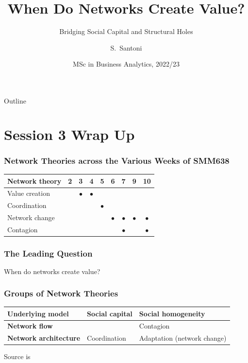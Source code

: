 \documentclass[notes, aspectratio=1610]{beamer}
\title[Networks and Value Creation]
{When Do Networks Create Value?}
\subtitle{Bridging Social Capital and Structural Holes}
\author{S.~Santoni\inst{1}\inst{2}}
\institute{
	\inst{1}%
	Bayes Business School
	\and
	\inst{2}%
	Soundcloud
	}
\date{MSc in Business Analytics, 2022/23}
\begin{document}
\begin{frame}
	\titlepage
\end{frame}

\begin{frame}{Outline}
	\tableofcontents
\end{frame}

\section{Session 3 Wrap Up}

\begin{frame}
	\frametitle{Network Theories across the Various Weeks of SMM638}
	\begin{table}
		\begin{tabular}[c]{l|c|c|c|c|c|c|c|c}
			\textbf{Network theory} & 
			\textbf{2} & 
			\textbf{3} & 
			\textbf{4} & 
			\textbf{5} & 
			\textbf{6} & 
			\textbf{7} & 
			\textbf{9} & 
			\textbf{10}\\
			\hline
			Value creation &  & $\bullet$ & $\bullet$ &  &  &  &  & \\	
			Coordination &  &  &  & $\bullet$ &  &  &  & \\	
			Network change &  &  &  &  & $\bullet$ & $\bullet$ & $\bullet$ & $\bullet$\\	
			Contagion &  &  &  &  &  & $\bullet$ &  & $\bullet$ \\	
		\end{tabular}
	\end{table}
\end{frame}

\begin{frame}
	\frametitle{The Leading Question}
		\begin{center}
			\Large When do networks create value?
		\end{center}
\end{frame}

\begin{frame}
	\frametitle{Groups of Network Theories}
	\centering
	\small
	\begin{table}
		\begin{center}
			\begin{tabular}[c]{l|l|l}
				\textbf{Underlying model} & 
				\textbf{Social capital} &
				\textbf{Social homogeneity}\\
				\hline
				\textbf{Network flow} & \cellcolor{blue!20}{\color{black}{Capitalization (value creation)}} & Contagion  \\
				\hline
				\textbf{Network architecture} & Coordination & Adaptation  (network change)\\
			\end{tabular}
		\end{center}
	\end{table}

	\vspace{1em}

	\raggedright \small Source is~\cite[][page 47]{scott2011}
\end{frame}
\end{document}
